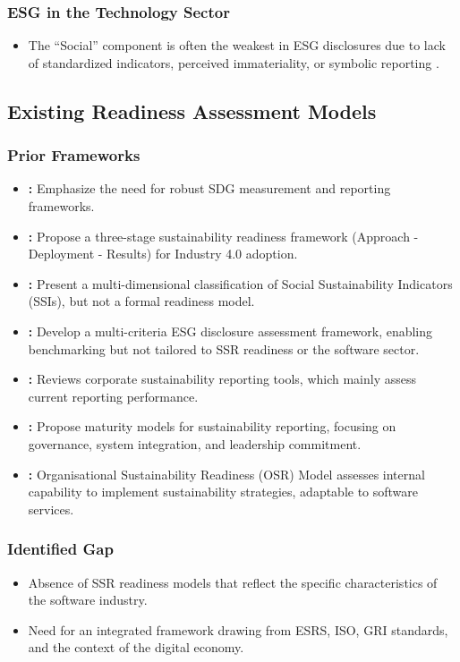 \subsubsection{ESG in the Technology Sector}
\begin{itemize}
    \item The “Social” component is often the weakest in ESG disclosures due to lack of standardized indicators, perceived immateriality, 
    or symbolic reporting \parencite{Christensen2021, Reitmaier2024}.
\end{itemize}

\subsection{Existing Readiness Assessment Models}
\subsubsection{Prior Frameworks}
\begin{itemize}
    \item \textbf{\textcite{Nava2023}:} Emphasize the need for robust SDG measurement and reporting frameworks.
    \item \textbf{\textcite{ElBaz2022}:} Propose a three-stage sustainability readiness framework (Approach - Deployment - Results) 
    for Industry 4.0 adoption.
    \item \textbf{\textcite{Afshari2022}:} Present a multi-dimensional classification of Social Sustainability Indicators (SSIs), but 
    not a formal readiness model.
    \item \textbf{\textcite{Zopounidis2020}:} Develop a multi-criteria ESG disclosure assessment framework, enabling benchmarking but 
    not tailored to SSR readiness or the software sector.
    \item \textbf{\textcite{Siew2015}:} Reviews corporate sustainability reporting tools, which mainly assess current reporting performance.
    \item \textbf{\textcite{Okongwu2013}:} Propose maturity models for sustainability reporting, focusing on governance, system integration, 
    and leadership commitment.
    \item \textbf{\textcite{Barletta2021}:} Organisational Sustainability Readiness (OSR) Model assesses internal capability to implement 
    sustainability strategies, adaptable to software services.
\end{itemize}

\subsubsection{Identified Gap}
\begin{itemize}
    \item Absence of SSR readiness models that reflect the specific characteristics of the software industry.
    \item Need for an integrated framework drawing from ESRS, ISO, GRI standards, and the context of the digital economy.
\end{itemize}

